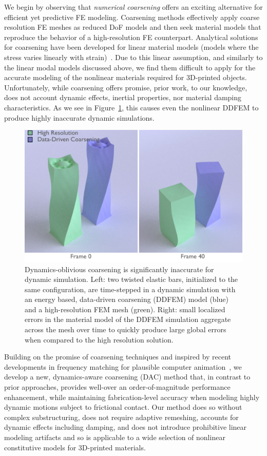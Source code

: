 We begin by observing that \emph{numerical coarsening} offers an exciting alternative for efficient yet predictive FE modeling. Coarsening methods effectively apply coarse resolution FE meshes as reduced DoF models and then seek material models that reproduce the behavior of a high-resolution FE counterpart. Analytical solutions for coarsening have been developed for linear material models (models where the stress varies linearly with strain)~\cite{Kharevych2009,Nesme2009,Torres:2016:HIC}.
Due to this linear assumption, and similarly to the linear modal models discussed above, we find them difficult to apply for the accurate modeling of the nonlinear materials required for 3D-printed objects.
Unfortunately, while coarsening offers promise, prior work, to our knowledge, does not account dynamic effects, inertial properties, nor material damping characteristics.
As we see in Figure~\ref{fig:coarse}, this causes even the nonlinear DDFEM to produce highly inaccurate dynamic simulations.
\begin{figure}
	\centering
	\includegraphics[width=0.7\columnwidth]{figs/DDFEM.pdf}	
	\caption{Dynamics-oblivious coarsening is significantly inaccurate for dynamic simulation. Left: two twisted elastic bars, initialized to the same configuration, are time-stepped in a dynamic simulation with an energy based, data-driven coarsening (DDFEM) model (blue) and a high-resolution FEM mesh (green). Right: small localized errors in the material model of the DDFEM simulation aggregate across the mesh over time to quickly produce large global errors when compared to the high resolution solution.}
	\label{fig:coarse}
\end{figure}
Building on the promise of coarsening techniques and inspired by recent developments in frequency matching for plausible computer animation~\cite{Li:2014:SEE,BinWang:2015fx}, we develop a new, dynamics-aware coarsening (DAC) method that, in contrast to prior approaches, provides well-over an order-of-magnitude performance enhancement, while maintaining fabrication-level accuracy when modeling highly dynamic motions subject to frictional contact. Our method does so without complex substructuring, does not require adaptive remeshing, accounts for dynamic effects including damping, and does not introduce prohibitive linear modeling artifacts and so is applicable to a wide selection of nonlinear constitutive models for 3D-printed materials.  


